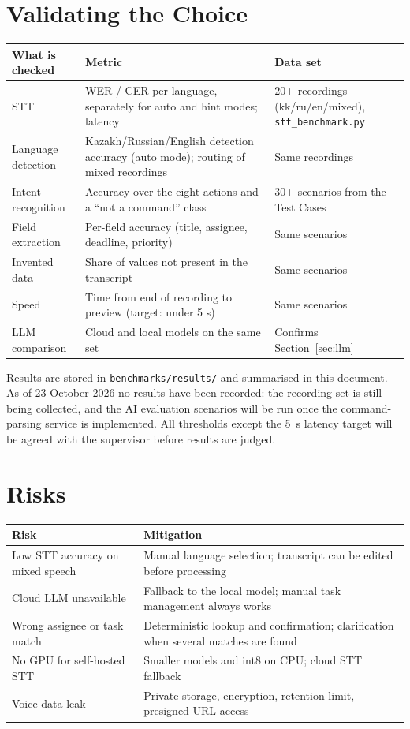 \documentclass[11pt,a4paper]{article}
\newcommand{\tblstart}{\small\rowcolors{2}{gray!7}{white}}
\newcommand{\code}[1]{\texttt{#1}}
\begin{document}
\section{Validating the Choice}

{\tblstart
\begin{xltabular}{\textwidth}{P{3.6cm} L P{4.6cm}}
\toprule
\textbf{What is checked} & \textbf{Metric} & \textbf{Data set} \\
\midrule
\endhead
STT & WER / CER per language, separately for auto and hint modes; latency & 20+ recordings (kk/ru/en/mixed), \code{stt\_benchmark.py} \\
Language detection & Kazakh/Russian/English detection accuracy (auto mode); routing of mixed recordings & Same recordings \\
Intent recognition & Accuracy over the eight actions and a ``not a command'' class & 30+ scenarios from the Test Cases \\
Field extraction & Per-field accuracy (title, assignee, deadline, priority) & Same scenarios \\
Invented data & Share of values not present in the transcript & Same scenarios \\
Speed & Time from end of recording to preview (target: under 5 s) & Same scenarios \\
LLM comparison & Cloud and local models on the same set & Confirms Section~\ref{sec:llm} \\
\bottomrule
\end{xltabular}}

Results are stored in \code{benchmarks/results/} and summarised in this document. As of 23 October 2026 no results have been recorded: the recording set is still being collected, and the AI evaluation scenarios will be run once the command-parsing service is implemented. All thresholds except the 5~s latency target will be agreed with the supervisor before results are judged.

\section{Risks}

{\tblstart
\begin{xltabular}{\textwidth}{P{5.4cm} L}
\toprule
\textbf{Risk} & \textbf{Mitigation} \\
\midrule
\endhead
Low STT accuracy on mixed speech & Manual language selection; transcript can be edited before processing \\
Cloud LLM unavailable & Fallback to the local model; manual task management always works \\
Wrong assignee or task match & Deterministic lookup and confirmation; clarification when several matches are found \\
No GPU for self-hosted STT & Smaller models and int8 on CPU; cloud STT fallback \\
Voice data leak & Private storage, encryption, retention limit, presigned URL access \\
\bottomrule
\end{xltabular}}
\end{document}

